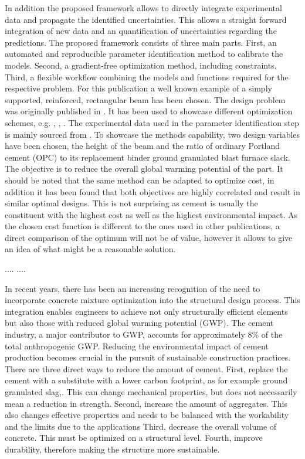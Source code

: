 In addition the proposed framework allows to directly integrate experimental data and propagate the identified uncertainties.
This allows a straight forward integration of new data and an quantification of uncertainties regarding the predictions.
The proposed framework consists of three main parts.
First, an automated and reproducible parameter identification method to calibrate the models.
Second, a gradient-free optimization method, including constraints.
Third, a flexible workflow combining the models and functions required for the respective problem. 
For this publication a well known example of a simply supported, reinforced, rectangular beam  has been chosen.
The design problem was originally published in \cite{everard1966reinforced}.
It has been used to showcase different optimization schemes, e.g. \cite{Chakrabarty_1992}, \cite{Coello_1997}, \cite{Pierott_2021}.
The experimental data used in the parameter identification step is mainly sourced from \cite{gruyaert2011}.
To showcase the methods capability, two design variables have been chosen, the height of the beam and the ratio of ordinary Portland cement (OPC) to its replacement binder ground granulated blast furnace slack.
The objective is to reduce the overall global warming potential of the part.
It should be noted that the same method can be adapted to optimize cost, in addition it has been found that both objectives are highly correlated and result in similar optimal designs.
This is not surprising as cement is usually the constituent with the highest cost as well as the highest environmental impact.
As the chosen cost function is different to the ones used in other publications, a direct comparison of the optimum will not be of value, however it allows to give an idea of what might be a reasonable solution.



....
....

In recent years, there has been an increasing recognition of the need to incorporate concrete mixture optimization into the structural design process. 
This integration enables engineers to achieve not only structurally efficient elements but also those with reduced global warming potential (GWP). 
The cement industry, a major contributor to GWP, accounts for approximately 8\% of the total anthropogenic GWP. 
Reducing the environmental impact of cement production becomes crucial in the pursuit of sustainable construction practices.
There are three direct ways to reduce the amount of cement.
First, replace the cement with a substitute with a lower carbon footprint, as for example ground granulated slag,.
This can change mechanical properties, but does not necessarily mean a reduction in strength.
Second, increase the amount of aggregates.
This also changes effective properties and needs to be balanced with the workability and the limits due to the applications
Third, decrease the overall volume of concrete.
This must be optimized on a structural level.
Fourth, improve durability, therefore making the structure more sustainable.

